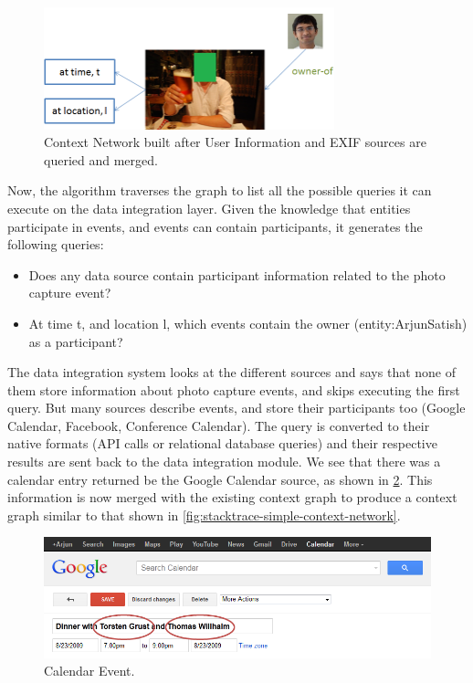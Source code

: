 \begin{figure}[h]
\centering
\includegraphics[width=0.75\textwidth]{media/chapter4/stacktrace/init-network.png}
\caption{Context Network built after User Information and EXIF sources are queried and merged.}
\label{fig:exif-network}
\end{figure}

Now, the algorithm traverses the graph to list all the possible queries it can execute on the data integration layer. Given the knowledge that entities participate in events, and events can contain participants, it generates the following queries:

\begin{itemize}
\item Does any data source contain participant information related to the photo capture event?
\item At time t, and location l, which events contain the owner (entity:ArjunSatish) as a participant?
\end{itemize}

The data integration system looks at the different sources and says that none of them store information about photo capture events, and skips executing the first query. But many sources describe events, and store their participants too (Google Calendar, Facebook, Conference Calendar). The query is converted to their native formats (API calls or relational database queries) and their respective results are sent back to the data integration module. We see that there was a calendar entry returned be the Google Calendar source, as shown in \ref{fig:stacktrace-simple-calendar}. This information is now merged with the existing context graph to produce a context graph similar to that shown in \ref{fig:stacktrace-simple-context-network}.

\begin{figure}[h]
\centering
\includegraphics[width=\textwidth]{media/chapter4/stacktrace/calendar.png}
\caption{Calendar Event.}
\label{fig:stacktrace-simple-calendar}
\end{figure}


